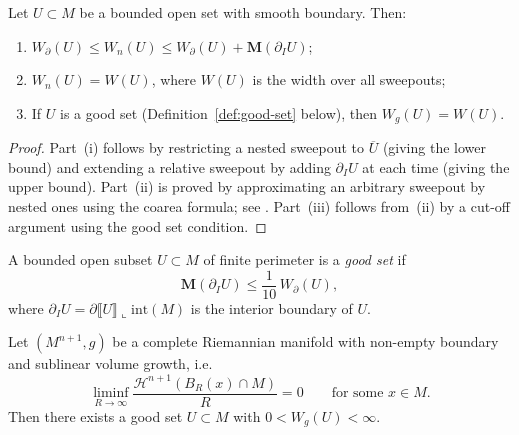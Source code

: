 \begin{proposition}\label{prop:width-inequalities}
Let $U \subset M$ be a bounded open set with smooth boundary. Then:
\begin{enumerate}[label=\textup{(\roman*)}]
    \item $W_\partial(U) \leq W_n(U) \leq W_\partial(U) + \mathbf{M}(\partial_I U)$;
    \item $W_n(U) = W(U)$, where $W(U)$ is the width over all sweepouts;
    \item If $U$ is a good set (Definition~\ref{def:good-set} below), then $W_g(U) = W(U)$.
\end{enumerate}
\end{proposition}

\begin{proof}
Part~(i) follows by restricting a nested sweepout to $\overline{U}$ (giving the lower bound) and extending a relative sweepout by adding $\partial_I U$ at each time (giving the upper bound). Part~(ii) is proved by approximating an arbitrary sweepout by nested ones using the coarea formula; see \cite[Lemma~4.2]{CL20}. Part~(iii) follows from~(ii) by a cut-off argument using the good set condition.
\end{proof}


\begin{definition}\label{def:good-set}
A bounded open subset $U \subset M$ of finite perimeter is a \emph{good set} if
\[
\mathbf{M}(\partial_I U) \leq \frac{1}{10}\, W_\partial(U),
\]
where $\partial_I U = \partial \llbracket U \rrbracket \llcorner \mathrm{int}(M)$ is the interior boundary of $U$.
\end{definition}

\begin{lemma}\label{lem:good-set-existence}
Let $(M^{n+1}, g)$ be a complete Riemannian manifold with non-empty boundary and sublinear volume growth, i.e.\
\[
\liminf_{R \to \infty} \frac{\mathcal{H}^{n+1}(B_R(x) \cap M)}{R} = 0 \qquad \text{for some } x \in M.
\]
Then there exists a good set $U \subset M$ with $0 < W_g(U) < \infty$.
\end{lemma}

